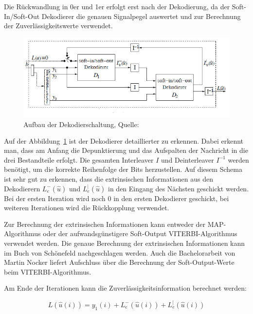 Die Rückwandlung in 0er und 1er erfolgt erst nach der Dekodierung, da der Soft-In/Soft-Out Dekodierer die genauen Signalpegel auswertet und zur Berechnung der Zuverlässigkeitswerte verwendet. 

\begin{figure}[th]
\centering
\includegraphics[width=\ScaleIfNeeded]{pictures/TurboDecoderSchema}
\caption{Aufbau der Dekodierschaltung, Quelle: \cite[262]{schoenfeld2012informations}}
\label{pic:decoderSchema}
\end{figure}

Auf der Abbildung~\ref{pic:decoderSchema} ist der Dekodierer detaillierter zu erkennen. Dabei erkennt man, dass am Anfang die Depunktierung und das Aufspalten der Nachricht in die drei Bestandteile erfolgt. Die gesamten Interleaver $I$ und Deinterleaver $I^{-1}$ werden benötigt, um die korrekte Reihenfolge der Bits herzustellen. Auf diesem Schema ist sehr gut zu erkennen, dass die extrinsischen Informationen aus den Dekodierern $L^-_e(\widehat{u})$ und $L^|_e(\widehat{u})$ in den Eingang des Nächsten geschickt werden. Bei der ersten Iteration wird noch 0 in den ersten Dekodierer geschickt, bei weiteren Iterationen wird die Rückkopplung verwendet.

Zur Berechnung der extrinsischen Informationen kann entweder der MAP-Algorithmus \cite[233-236]{schoenfeld2012informations} oder der aufwandsgünstigere Soft-Output VITERBI-Algorithmus \cite[222-233]{schoenfeld2012informations} verwendet werden. Die genaue Berechnung der extrinsischen Informationen kann im Buch von Schönefeld \cite[263 f.]{schoenfeld2012informations} nachgeschlagen werden. Auch die Bachelorarbeit von Martin Nocker \cite{nocker} liefert Aufschluss über die Berechnung der Soft-Output-Werte beim VITERBI-Algorithmus.

Am Ende der Iterationen kann die Zuverlässigkeitsinformation berechnet werden:

\begin{equation}
L(\widehat{u}(i))=y_1(i)+L^-_e(\widehat{u}(i))+L^|_e(\widehat{u}(i))
\label{eq:resultDecode}
\end{equation}

